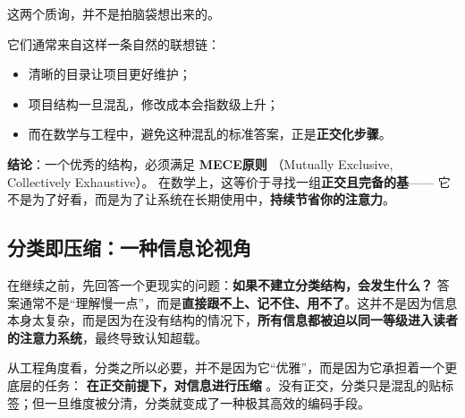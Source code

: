 \documentclass[11pt, a4paper]{ctexart}
\newcommand{\lowfreq}[1]{%
	{\Large\bfseries\color{red!60!black} #1}%
}
\begin{document}
这两个质询，并不是拍脑袋想出来的。

它们通常来自这样一条自然的联想链：
\begin{itemize}
	\item 清晰的目录让项目更好维护；
	\item 项目结构一旦混乱，修改成本会指数级上升；
	\item 而在数学与工程中，避免这种混乱的标准答案，正是\textbf{正交化步骤}。
\end{itemize}

\textbf{结论}：一个优秀的结构，必须满足 \lowfreq{MECE原则}（Mutually Exclusive, Collectively Exhaustive）。
在数学上，这等价于寻找一组\textbf{正交且完备的基}——
它不是为了好看，而是为了让系统在长期使用中，\textbf{持续节省你的注意力}。

	
	\newpage
	
	\subsection{分类即压缩：一种信息论视角}
	
	在继续之前，先回答一个更现实的问题：\textbf{如果不建立分类结构，会发生什么？}  
	答案通常不是“理解慢一点”，而是\textbf{直接跟不上、记不住、用不了}。这并不是因为信息本身太复杂，而是因为在没有结构的情况下，\textbf{所有信息都被迫以同一等级进入读者的注意力系统}，最终导致认知超载。
	
	从工程角度看，分类之所以必要，并不是因为它“优雅”，而是因为它承担着一个更底层的任务：\lowfreq{在正交前提下，对信息进行压缩}。没有正交，分类只是混乱的贴标签；但一旦维度被分清，分类就变成了一种极其高效的编码手段。
	
\end{document}
